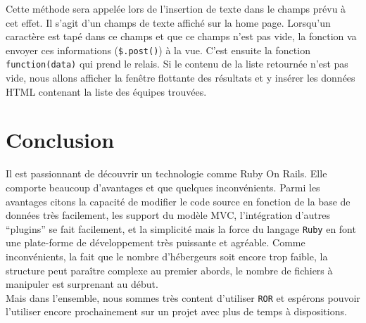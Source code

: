 \documentclass[10pt,a4paper,titlepage]{article}
\begin{document}
Cette méthode sera appelée lors de l'insertion de texte dans le champs prévu à cet effet. Il s'agit d'un champs de texte affiché sur la home page. Lorsqu'un caractère est tapé dans ce champs et que ce champs n'est pas vide, la fonction va envoyer ces informations (\texttt{\$.post()})  à la vue. C'est ensuite la fonction \texttt{function(data)} qui prend le relais. Si le contenu de la liste retournée n'est pas vide, nous allons afficher la fenêtre flottante des résultats et y insérer les données HTML contenant la liste des équipes trouvées.

\section{Conclusion}

Il est passionnant de découvrir un technologie comme Ruby On Rails. Elle comporte beaucoup d'avantages et que quelques inconvénients. Parmi les avantages citons la capacité de modifier le code source en fonction de la base de données très facilement, les support du modèle MVC, l'intégration d'autres “plugins” se fait facilement, et la simplicité mais la force du langage \texttt{Ruby} en font une plate-forme de développement très puissante et agréable. Comme inconvénients, la fait que le nombre d'hébergeurs soit encore trop faible, la structure peut paraître complexe au premier abords, le nombre de fichiers à manipuler est surprenant au début.\\

Mais dans l'ensemble, nous sommes très content d'utiliser \texttt{ROR} et espérons pouvoir l'utiliser encore prochainement sur un projet avec plus de temps à dispositions. 
\end{document}
